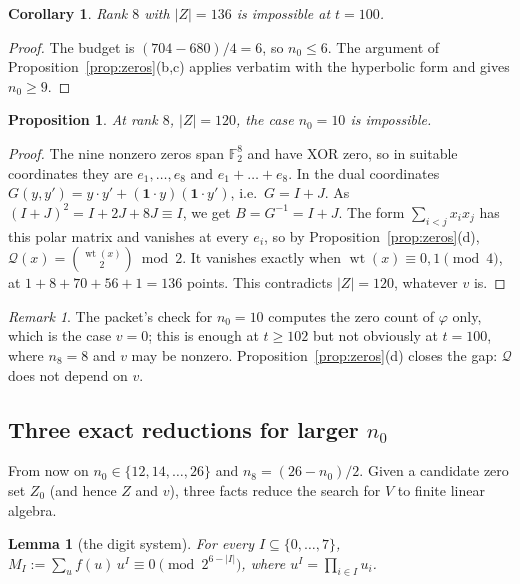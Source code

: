 \documentclass[11pt]{article}
\newtheorem{proposition}[theorem]{Proposition}
\newtheorem{lemma}[theorem]{Lemma}
\newtheorem{corollary}[theorem]{Corollary}
\theoremstyle{definition}
\theoremstyle{remark}
\newtheorem{remark}[theorem]{Remark}
\newcommand{\F}{\mathbb{F}}
\newcommand{\wt}{\operatorname{wt}}
\newcommand{\ind}{\mathbf{1}}
\DeclareRobustCommand{\_}{\textunderscore\allowbreak}
\begin{document}
\begin{corollary}\label{cor:136}
Rank $8$ with $|Z|=136$ is impossible at $t=100$.
\end{corollary}

\begin{proof}
The budget is $(704-680)/4=6$, so $n_0\le6$. The argument of Proposition~\ref{prop:zeros}(b,c) applies verbatim with the hyperbolic form and gives $n_0\ge9$.
\end{proof}

\begin{proposition}\label{prop:n10}
At rank $8$, $|Z|=120$, the case $n_0=10$ is impossible.
\end{proposition}

\begin{proof}
The nine nonzero zeros span $\F_2^8$ and have XOR zero, so in suitable coordinates they are $e_1,\dots,e_8$ and $e_1+\dots+e_8$. In the dual coordinates $G(y,y')=y\cdot y'+(\ind\cdot y)(\ind\cdot y')$, i.e.\ $G=I+J$. As $(I+J)^2=I+2J+8J\equiv I$, we get $B=G^{-1}=I+J$. The form $\sum_{i<j}x_ix_j$ has this polar matrix and vanishes at every $e_i$, so by Proposition~\ref{prop:zeros}(d), $\mathcal Q(x)=\binom{\wt(x)}{2}\bmod2$. It vanishes exactly when $\wt(x)\equiv0,1\pmod4$, at $1+8+70+56+1=136$ points. This contradicts $|Z|=120$, whatever $v$ is.
\end{proof}

\begin{remark}
The packet's check for $n_0=10$ computes the zero count of $\varphi$ only, which is the case $v=0$; this is enough at $t\ge102$ but not obviously at $t=100$, where $n_8=8$ and $v$ may be nonzero. Proposition~\ref{prop:zeros}(d) closes the gap: $\mathcal Q$ does not depend on $v$.
\end{remark}

\subsection{Three exact reductions for larger $n_0$}

From now on $n_0\in\{12,14,\dots,26\}$ and $n_8=(26-n_0)/2$. Given a candidate zero set $Z_0$ (and hence $Z$ and $v$), three facts reduce the search for $V$ to finite linear algebra.

\begin{lemma}[the digit system]\label{lem:digits}
For every $I\subseteq\{0,\dots,7\}$, $M_I:=\sum_u f(u)\,u^I\equiv0\pmod{2^{6-|I|}}$, where $u^I=\prod_{i\in I}u_i$.
\end{lemma}
\end{document}
